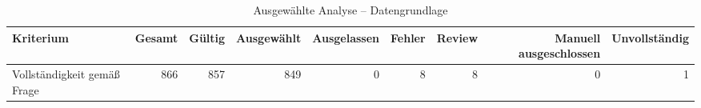 \begin{table}[htbp]
\centering
\caption{Ausgewählte Analyse -- Datengrundlage}
\begin{tabular}{lrrrrrrrr}
\toprule
Kriterium & Gesamt & Gültig & Ausgewählt & Ausgelassen & Fehler & Review & Manuell ausgeschlossen & Unvollständig \\
\midrule
Vollständigkeit gemäß Frage & 866 & 857 & 849 & 0 & 8 & 8 & 0 & 1 \\
\bottomrule
\end{tabular}
\end{table}
